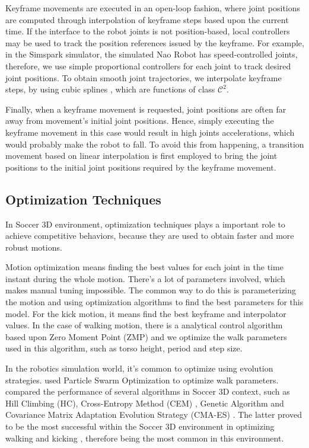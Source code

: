 Keyframe movements are executed in an open-loop fashion, where joint positions are computed through interpolation of keyframe steps based upon the current time. If the interface to the robot joints is not position-based, local controllers may be used to track the position references issued by the keyframe. For example, in the Simspark simulator, the simulated Nao Robot has speed-controlled joints, therefore, we use simple proportional controllers for each joint to track desired joint positions. To obtain smooth joint trajectories, we interpolate keyframe steps, by using cubic splines \cite{bartels1987}, which are functions of class \( \mathcal{C}^2 \). 

Finally, when a keyframe movement is requested, joint positions are often far away from movement's initial joint positions. Hence, simply executing the keyframe movement in this case would result in high joints accelerations, which would probably make the robot to fall. To avoid this from happening, a transition movement based on linear interpolation is first employed to bring the joint positions to the initial joint positions required by the keyframe movement.

\subsection{Optimization Techniques}

In Soccer 3D environment, optimization techniques plays a important role to achieve competitive behaviors, because they are used to obtain faster and more robust motions.

Motion optimization means finding the best values for each joint in the time instant during the whole motion. There's a lot of parameters involved, which makes manual tuning impossible. The common way to do this is parameterizing the motion and using optimization algorithms to find the best parameters for this model. For the kick motion, it means find the best keyframe and interpolator values. In the case of walking motion, there is a analytical control algorithm based upon Zero Moment Point (ZMP) and we optimize the walk parameters used in this algorithm, such as torso height, period and step size.

In the robotics simulation world, it's common to optimize using evolution strategies. \citeauthor{tgmaximo} used Particle Swarm Optimization to optimize walk parameters. \cite{AAMAS11-urieli} compared the performance of several algorithms in Soccer 3D context, such as Hill Climbing (HC), Cross-Entropy Method (CEM) \cite{Rubinstein:2004:CEM:1014902}, Genetic Algorithm and Covariance Matrix Adaptation Evolution Strategy (CMA-ES) \cite{cmaes}. The latter proved to be the most successful within the Soccer 3D environment in optimizing walking and kicking \cite{AAAI12-MacAlpine} \cite{AAMAS11-urieli}, therefore being the most common in this environment. 

